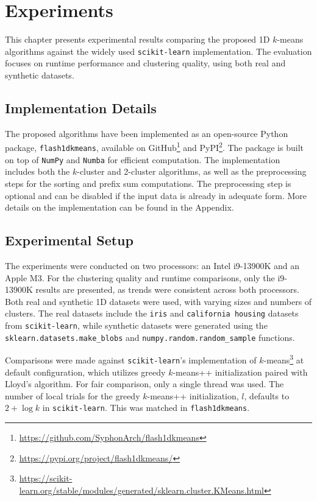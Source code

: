 \chapter{Experiments}\label{chap:experiments}

This chapter presents experimental results comparing the proposed 1D $k$-means algorithms against the widely used \texttt{scikit-learn} implementation. The evaluation focuses on runtime performance and clustering quality, using both real and synthetic datasets.

\section{Implementation Details}

\sloppy
The proposed algorithms have been implemented as an open-source Python package, \texttt{flash1dkmeans}, available on GitHub\footnote{\url{https://github.com/SyphonArch/flash1dkmeans}} and PyPI\footnote{\url{https://pypi.org/project/flash1dkmeans/}}. The package is built on top of \texttt{NumPy} \cite{numpy} and \texttt{Numba} \cite{numba} for efficient computation. The implementation includes both the $k$-cluster and 2-cluster algorithms, as well as the preprocessing steps for the sorting and prefix sum computations. The preprocessing step is optional and can be disabled if the input data is already in adequate form. More details on the implementation can be found in the Appendix.

\section{Experimental Setup}

The experiments were conducted on two processors: an Intel i9-13900K and an Apple M3. For the clustering quality and runtime comparisons, only the i9-13900K results are presented, as trends were consistent across both processors. Both real and synthetic 1D datasets were used, with varying sizes and numbers of clusters. The real datasets include the \texttt{iris} and \texttt{california housing} datasets from \texttt{scikit-learn}, while synthetic datasets were generated using the \texttt{sklearn.datasets.make\_blobs} and \texttt{numpy.random.random\_sample} functions.

Comparisons were made against \texttt{scikit-learn}'s implementation of $k$-means\footnote{\url{https://scikit-learn.org/stable/modules/generated/sklearn.cluster.KMeans.html}} at default configuration, which utilizes greedy $k$-means++ initialization paired with Lloyd's algorithm. For fair comparison, only a single thread was used. The number of local trials for the greedy $k$-means++ initialization, $l$, defaults to $2 + \log k$ in \texttt{scikit-learn}. This was matched in \texttt{flash1dkmeans}.

